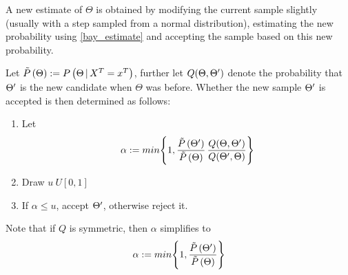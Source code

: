 	A new estimate of $\Theta$ is obtained by modifying the current sample slightly (usually with a step sampled from a normal distribution), estimating the new probability using \ref{bay_estimate} and accepting the sample based on this new probability. 
	
	Let $\tilde{P}\left(\Theta\right) := P\left(\Theta \, | \, X^T = x^T\right)$, further let $Q(\Theta, \Theta^\prime)$ denote the probability that $\Theta^\prime$ is the new candidate when $\Theta$ was before. 
	Whether the new sample $\Theta^\prime$ is accepted is then determined as follows:
	\begin{enumerate}
		\item Let 
		\[
			\alpha := min \Bigg\{ 1,  \frac{\tilde{P}\left(\Theta^\prime\right)}{\tilde{P}\left(\Theta\right)} \, \frac{Q(\Theta, \Theta^\prime)}{Q(\Theta^\prime, \Theta)}			
			\Bigg\}
		\]
		\item Draw $u ~ U[0, 1]$
		\item If $\alpha \leq u$, accept $\Theta^\prime$, otherwise reject it. 
	\end{enumerate} 

	Note that if $Q$ is symmetric, then $\alpha$ simplifies to 
	\[
			\alpha := min \Bigg\{ 1,  \frac{\tilde{P}\left(\Theta^\prime\right)}{\tilde{P}\left(\Theta\right)}			
		\Bigg\}
	\]
	
	
